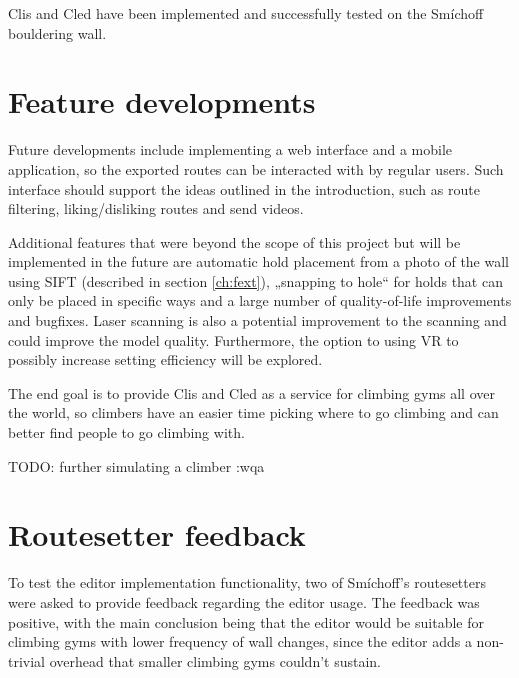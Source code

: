 \label{sec:conclusion}
Clis and Cled have been implemented and successfully tested on the Smíchoff bouldering wall.

\setcounter{secnumdepth}{0}

\section{Feature developments}
Future developments include implementing a web interface and a mobile application, so the exported routes can be interacted with by regular users.
Such interface should support the ideas outlined in the introduction, such as route filtering, liking/disliking routes and send videos.

Additional features that were beyond the scope of this project but will be implemented in the future are automatic hold placement from a photo of the wall using SIFT (described in section \ref{ch:fext}), „snapping to hole“ for holds that can only be placed in specific ways and a large number of quality-of-life improvements and bugfixes.
Laser scanning is also a potential improvement to the scanning and could improve the model quality.
Furthermore, the option to using VR to possibly increase setting efficiency will be explored.

The end goal is to provide Clis and Cled as a service for climbing gyms all over the world, so climbers have an easier time picking where to go climbing and can better find people to go climbing with.

TODO: further simulating a climber :wqa

\section{Routesetter feedback}
To test the editor implementation functionality, two of Smíchoff's routesetters were asked to provide feedback regarding the editor usage.
The feedback was positive, with the main conclusion being that the editor would be suitable for climbing gyms with lower frequency of wall changes, since the editor adds a non-trivial overhead that smaller climbing gyms couldn't sustain.

\setcounter{secnumdepth}{3}
